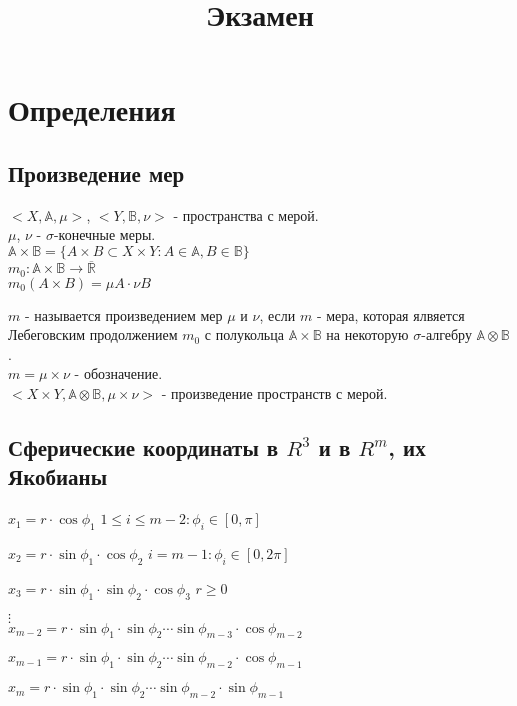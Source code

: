\documentclass[paper=a4, fontsize=14pt]{report}
\author{}
\title{Экзамен}
\begin{document}
\maketitle
\tableofcontents
\newpage

\chapter{Определения}

\section{Произведение мер}
$<X, \mathds{A}, \mu>$, $<Y, \mathds{B}, \nu>$ - пространства с мерой.\\
$\mu$, $\nu$ - $\sigma$-конечные меры.\\
$\mathds{A} \times \mathds{B} = \{A\times B \subset X \times Y : A \in \mathds{A}, B \in \mathds{B} \}$ \\
$m_0 : \mathds{A} \times \mathds{B} \rightarrow \overline{\mathds{R}}$\\ $m_0(A \times B) = \mu A \cdot \nu B$

$m$ - называется произведением мер $\mu$ и $\nu$, если $m$ - мера, которая ялвяется Лебеговским продолжением $m_0$ с полукольца $\mathds{A} \times \mathds{B}$ на некоторую $\sigma$-алгебру $\mathds{A} \otimes \mathds{B}$.\\
$m = \mu \times \nu$ - обозначение. \\
$<X \times Y, \mathds{A} \otimes \mathds{B}, \mu \times \nu>$ - произведение пространств с мерой.

\section{Сферические координаты в $ R^3 $ и в $ R^m $, их Якобианы}
$x_1 = r \cdot \cos \phi_1$
\hfill
$1 \leq i \leq m-2: \phi_i \in [0,\pi]$

$x_2 = r \cdot \sin \phi_1 \cdot \cos \phi_2$
\hfill
$i=m-1: \phi_i \in [0,2\pi]$

$x_3 = r \cdot \sin \phi_1 \cdot \sin \phi_2 \cdot \cos \phi_3$
\hfill
$r \geq 0$

$\vdots$\\
$x_{m-2} = r \cdot \sin \phi_1 \cdot \sin \phi_2 \cdots \sin \phi_{m-3} \cdot \cos \phi_{m-2}$

$x_{m-1} = r \cdot \sin \phi_1 \cdot \sin \phi_2 \cdots \sin \phi_{m-2} \cdot \cos \phi_{m-1}$

$x_{m} = r \cdot \sin \phi_1 \cdot \sin \phi_2 \cdots \sin \phi_{m-2} \cdot \sin \phi_{m-1}$\\
\end{document}
